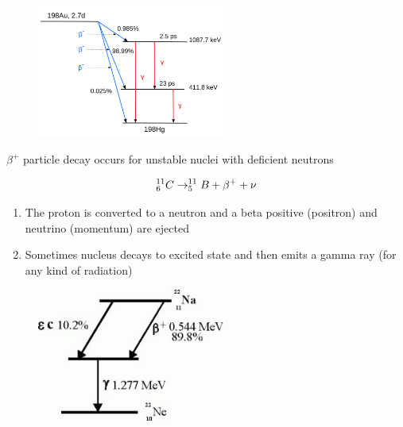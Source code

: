 \documentclass[aspectratio=1610,pdftex,dvipsnames,compress,xcolor={dvipsnames}]{beamer}
\begin{document}
\begin{frame}{}
    \begin{figure}
        \centering
        \includegraphics[width=0.55\textwidth]{beta.con.jpg}
    \end{figure}
\end{frame}


\begin{frame}{$\beta^+$ particle decay occurs for unstable nuclei with deficient neutrons}

    \begin{equation}
        \LARGE
        ^{11}_{6}C \rightarrow ^{11}_{5}B + \beta^{+} + \nu 
    \end{equation}

    \vspace*{\fill}

    \begin{enumerate}[series=outerlist,topsep=0pt,itemsep=21pt,leftmargin=*,label=(\arabic*)]
        \item[]The proton is converted to a neutron and a beta positive (positron) and neutrino (momentum) are ejected
        \item[]Sometimes nucleus decays to excited state and then emits a gamma ray (for any kind of radiation)
    \end{enumerate}
\end{frame}


\begin{frame}{}
    \begin{figure}
        \centering
        \includegraphics[width=0.55\textwidth]{betaplus.con.jpg}
    \end{figure}
\end{frame}
\end{document}

